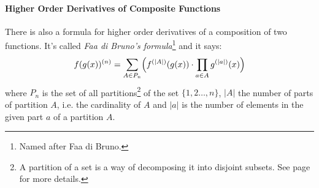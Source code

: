 


\paragraph{Higher Order Derivatives of Composite Functions}
There is also a formula for higher order derivatives of a composition of two functions. It's called \emph{Faa di Bruno's formula}\footnote{Named after Faa di Bruno.} and it says:
\begin{equation}
f(g(x))^{(n)} = 
\sum_{A \in P_n} 
\Bigl(
f^{(|A|)}(g(x)) \cdot \prod_{a \in A} g^{(|a|)}(x) 
\Bigr)
\end{equation}
where $P_n$ is the set of all partitions\footnote{A partition of a set is a way of decomposing it into disjoint subsets. See page \pageref{Sec:PartitionsOfSets} for more details.} of the set $\{1,2\ldots,n\}$, $|A|$ the number of parts of partition $A$, i.e. the cardinality of $A$ and $|a|$ is the number of elements in the given part $a$ of a partition $A$. 

